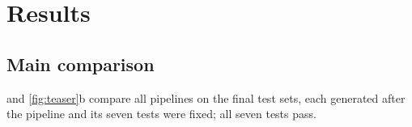 \section{Results}
\label{sec:results}

\begin{table}[t]
\centering
\small
\setlength{\tabcolsep}{4.2pt}

\caption{\textbf{Every pipeline on the three test sets.}
Risk is the fraction of outputs with error above $\varepsilon = 0.10$; cost is compute per query relative to simulating it with the reference. Each object counts once.
Risks are against the reference at PhysCtrl's time step $\Delta t$, as pre-registered; \cref{tab:reference} repeats them against $\Delta t/2$ and $\Delta t/4$.
\emph{All three}: the largest gap to simulating every query, risk(pipeline) $-$ risk(reference at $\Delta t$), over the three sets and the three reference steps (defined after the Phase 10c verdict), and the largest cost.
Grey: risk above 0.03, or a gap above 0.03. Bold: the cheapest pipeline within 0.03 in each column.
M1--M3 are the reference solver at tuned cheaper settings. $^\dagger$: not run on this contact set; value from an earlier contact set (\cref{sec:res-contact}).}
\label{tab:main}
\end{table}

\subsection{Main comparison}
\label{sec:res-main}
 and \cref{fig:teaser}b compare all pipelines on the final test sets, each generated after the pipeline and its seven tests were fixed; all seven tests pass.

